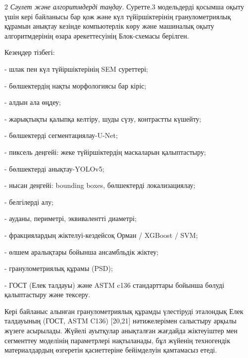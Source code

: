 \begin{figs}
\hspace{-3cm}
\end{figs}
\vspace{-0.6cm}
\begin{figs}
\hspace{-3cm}
\end{figs}

\begin{multicols}{2}
\emph{Сәулет және алгоритмдерді таңдау.} Суретте.3 модельдерді қосымша
оқыту үшін кері байланысы бар қож және күл түйіршіктерінің
гранулометриялық құрамын анықтау кезінде компьютерлік көру және
машиналық оқыту алгоритмдерінің өзара әрекеттесуінің Блок-схемасы
берілген.

Кезеңдер тізбегі:

- шлак пен күл түйіршіктерінің SEM суреттері;

- бөлшектердің нақты морфологиясы бар кіріс;

- алдын ала өңдеу;

- жарықтықты қалыпқа келтіру, шуды сүзу, контрастты күшейту;

- бөлшектерді сегментациялау-U-Net;

- пиксель деңгейі: жеке түйіршіктердің маскаларын қалыптастыру;

- бөлшектерді анықтау-YOLOv5;

- нысан деңгейі: bounding boxes, бөлшектерді локализациялау;

- белгілерді алу;

- ауданы, периметрі, эквивалентті диаметрі;

- фракциялардың жіктелуі-кездейсоқ Орман / XGBoost / SVM;

- өлшем аралықтары бойынша ансамбльдік жіктеу;

- гранулометриялық құрамы (PSD);

- ГОСТ (Елек талдауы) және ASTM c136 стандарттары бойынша бөлуді
қалыптастыру және тексеру.

Кері байланыс алынған гранулометриялық құрамды үлестіруді эталондық Елек
талдауының (ГОСТ, ASTM C136) {[}20,21{]} нәтижелерімен салыстыру арқылы
жүзеге асырылады. Жүйелі ауытқулар анықталған жағдайда жіктеуіштер мен
сегменттеу моделінің параметрлері нақтыланады, бұл жүйенің техногендік
материалдардың өзгеретін қасиеттеріне бейімделуін қамтамасыз етеді.
\end{multicols}

